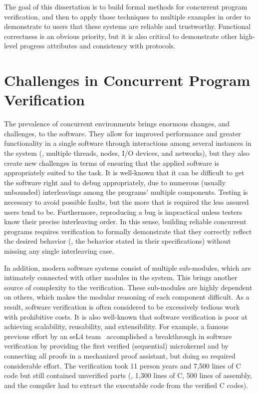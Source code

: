 The goal of this dissertation is to build formal methods for concurrent program verification, 
and then to apply those techniques to multiple examples in order to demonstrate to users that these systems are reliable and trustworthy. 
 Functional correctness is an obvious priority, but it is also critical to demonstrate other high-level progress attributes and consistency with protocols. 

\section{Challenges in Concurrent Program Verification}
\label{chapter:introduction:sec:challenges-in-concurrent-program-verification}

The prevalence of concurrent environments brings enormous changes, and challenges, to the software. 
They allow for improved performance and greater functionality in a single software 
through interactions among several instances in the system (\ie, multiple threads, nodes, I/O devices, and networks), 
but they also create new challenges in terms of ensuring that the applied software is appropriately suited to the task. 
It is well-known that it can be difficult to get the software right and to debug appropriately, 
due to numerous (usually unbounded) interleavings among the programs’ multiple components. 
Testing is necessary to avoid possible faults, but the more that is required the less assured users tend to be. 
Furthermore, reproducing a bug is impractical unless testers know their precise interleaving order. 
In this sense, building reliable concurrent programs requires verification to formally demonstrate 
that they correctly reflect the desired behavior (\ie, the behavior stated in their specifications) without missing any single interleaving case.

In addition, modern software systems consist of multiple sub-modules, which are intimately connected with other modules in the system. 
This brings another source of complexity to the verification. 
These sub-modules are highly dependent on others, which makes the modular reasoning of each component difficult. 
As a result, software verification is often considered to be excessively tedious work with prohibitive costs.
It is also well-known that software verification is poor at achieving scalability, reusability, and extensibility.
For example, a famous previous effort by an seL4 team~\cite{klein2009sel4} accomplished a breakthrough in software verification 
by providing the first verified (sequential) microkernel and by connecting all proofs in a mechanized proof assistant, 
but doing so required considerable effort. 
The verification took 11 person years and 7,500 lines of C code but still contained 
unverified parts (\ie, 1,300 lines of C, 500 lines of assembly, and the compiler had to extract the executable code from the verified C codes). 

